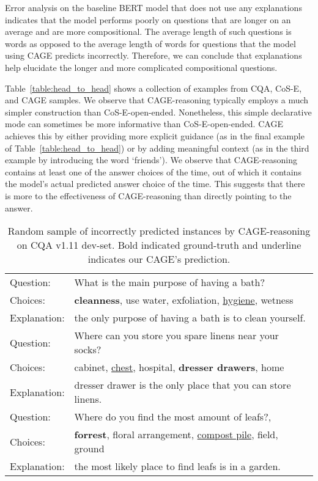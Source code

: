 \documentclass[11pt,a4paper]{article}
\begin{document}
Error analysis on the baseline BERT model that does not use any explanations indicates that the model performs poorly on questions that are longer on an average and are more compositional. The average length of such questions is  words as opposed to the average length of  words for questions that the  model using CAGE predicts incorrectly. Therefore, we can conclude that explanations help elucidate the longer and more complicated compositional questions.


Table~\ref{table:head_to_head} shows a collection of examples from CQA, CoS-E, and CAGE samples.
We observe that CAGE-reasoning typically employs a much simpler construction than CoS-E-open-ended.
Nonetheless, this simple declarative mode can sometimes be more informative than CoS-E-open-ended.
CAGE achieves this by either providing more explicit guidance (as in the final example of Table~\ref{table:head_to_head})
or by adding meaningful context (as in the third example by introducing the word `friends').
We observe that CAGE-reasoning contains at least one of the answer choices  of the time, 
out of which it contains the model's actual predicted answer choice  of the time.
This suggests that there is more to the effectiveness of CAGE-reasoning than directly pointing to the answer. 

\begin{table}[!ht]
\centering
\setlength{\tabcolsep}{3pt}
\scriptsize
\begin{tabular}{ll}
\toprule
Question: &What is the main purpose of having a bath?\\
Choices:& \textbf{cleanness}, use water, exfoliation, \ul{hygiene}, wetness\\
Explanation: &the only purpose of having a bath is to clean yourself.\\
\midrule
Question: &Where can you store you spare linens near your socks?\\
Choices:& cabinet, \ul{chest}, hospital, \textbf{dresser drawers}, home\\
Explanation: &dresser drawer is the only place that you can store linens.\\
\midrule
Question: &Where do you find the most amount of leafs?,\\
Choices:& \textbf{forrest}, floral arrangement, \ul{compost pile}, field, ground\\
Explanation: &the most likely place to find leafs is in a garden.\\
\bottomrule
\end{tabular}
\caption{Random sample of incorrectly predicted instances by CAGE-reasoning on CQA v1.11 dev-set. Bold indicated ground-truth and underline indicates our CAGE's prediction.}
\vspace{-0.5cm}
\label{table:v1.11}
\end{table}
\end{document}
